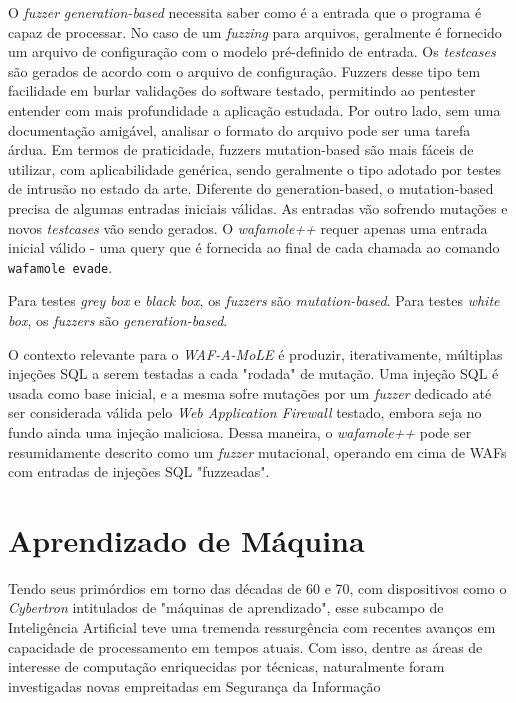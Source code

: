 O \textit{fuzzer} \textit{generation-based} necessita saber como é a entrada que o programa é capaz de processar. No caso de um \textit{fuzzing} para arquivos, geralmente é fornecido um arquivo de configuração com o modelo pré-definido de entrada. Os \textit{testcases} são gerados de acordo com o arquivo de configuração. Fuzzers desse tipo tem facilidade em burlar validações do software testado, permitindo ao pentester entender com mais profundidade a aplicação estudada. Por outro lado, sem uma documentação amigável, analisar o formato do arquivo pode ser uma tarefa árdua.
Em termos de praticidade, fuzzers mutation-based são mais fáceis de utilizar, com aplicabilidade genérica, sendo geralmente o tipo adotado por testes de intrusão no estado da arte. Diferente do generation-based, o mutation-based precisa de algumas entradas iniciais válidas. As entradas vão sofrendo mutações e novos \textit{testcases} vão sendo gerados. O \textit{wafamole++} requer apenas uma entrada inicial válido - uma query que é fornecida ao final de cada chamada ao comando \verb+wafamole evade+.

Para testes \textit{grey box} e \textit{black box}, os \textit{fuzzers} são \textit{mutation-based}. Para testes \textit{white box}, os \textit{fuzzers} são \textit{generation-based}.

O contexto relevante para o \textit{WAF-A-MoLE} é produzir, iterativamente, múltiplas injeções SQL a serem testadas a cada "rodada" de mutação. Uma injeção SQL é usada como base inicial, e a mesma sofre mutações por um \textit{fuzzer} dedicado até ser considerada válida pelo \textit{Web Application Firewall} testado, embora seja no fundo ainda uma injeção maliciosa. Dessa maneira, o \textit{wafamole++} pode ser resumidamente descrito como um \textit{fuzzer} mutacional, operando em cima de WAFs com entradas de injeções SQL "fuzzeadas".

\section{Aprendizado de Máquina}

Tendo seus primórdios em torno das décadas de 60 e 70, com dispositivos como o \textit{Cybertron} intitulados de "máquinas de aprendizado", esse subcampo de Inteligência Artificial teve uma tremenda ressurgência com recentes avanços em capacidade de processamento em tempos atuais. Com isso, dentre as áreas de interesse de computação enriquecidas por técnicas, naturalmente foram investigadas novas empreitadas em Segurança da Informação

